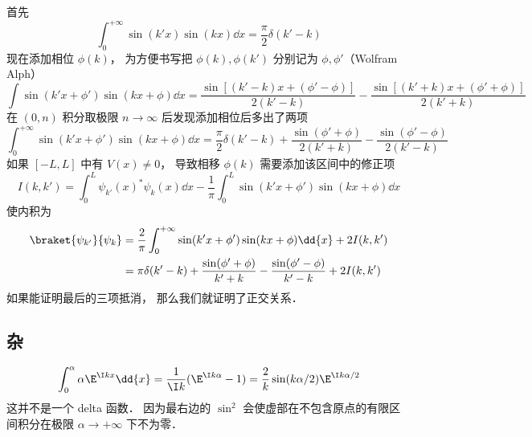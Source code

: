 首先
\begin{equation}
\int_{0}^{+\infty} \sin(k'x)\sin(kx)\dd{x} = \frac{\pi}{2}\delta(k'-k)
\end{equation}
现在添加相位 $\phi(k)$， 为方便书写把 $\phi(k),\phi(k')$ 分别记为 $\phi, \phi'$（Wolfram Alph）
\begin{equation}
\int \sin(k'x+\phi')\sin(kx+\phi) \dd{x} = \frac{\sin[(k'-k)x + (\phi'-\phi)]}{2(k'-k)}
- \frac{\sin[(k'+k)x+(\phi'+\phi)]}{2(k'+k)}
\end{equation}
在 $(0,n)$ 积分取极限 $n\to\infty$ 后发现添加相位后多出了两项
\begin{equation}
\int_{0}^{+\infty} \sin(k'x+\phi')\sin(kx+\phi) \dd{x} = \frac{\pi}{2}\delta(k'-k)
+ \frac{\sin(\phi'+\phi)}{2(k'+k)} - \frac{\sin(\phi'-\phi)}{2(k'-k)}
\end{equation}
如果 $[-L,L]$ 中有 $V(x) \ne 0$， 导致相移 $\phi(k)$ 需要添加该区间中的修正项
\begin{equation}
I(k,k') = \int_0^L \psi_{k'}(x)^* \psi_k(x) \dd{x}
-\frac{1}{\pi}\int_{0}^{L} \sin(k'x+\phi')\sin(kx+\phi) \dd{x}
\end{equation}
使内积为
\begin{equation}
\begin{aligned}
\braket{\psi_{k'}}{\psi_k} &= \frac{2}{\pi}\int_{0}^{+\infty} \sin(k'x+\phi')\sin(kx+\phi) \dd{x} + 2I(k,k')\\
&= \pi\delta(k'-k) + \frac{\sin(\phi'+\phi)}{k'+k} - \frac{\sin(\phi'-\phi)}{k'-k} + 2I(k,k')
\end{aligned}
\end{equation}
如果能证明最后的三项抵消， 那么我们就证明了正交关系．

\subsection{杂}
\begin{equation}
\int_0^\alpha\alpha \E^{\I kx} \dd{x} = \frac{1}{\I k} (\E^{\I k\alpha} - 1)
= \frac{2}{ k} \sin(k\alpha/2) \E^{\I k\alpha/2}
\end{equation}
这并不是一个 delta 函数． 因为最右边的 $\sin^2$ 会使虚部在不包含原点的有限区间积分在极限 $\alpha \to +\infty$ 下不为零．

